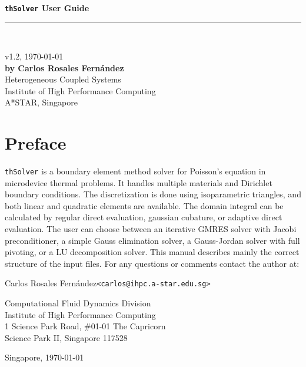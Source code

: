 \documentclass[12pt]{article}
\begin{document}
\begin{titlepage}
\verb+      +
\vspace{3cm}
\begin{flushright}
{\huge\bf\verb+thSolver+ User Guide}
\rule{150mm}{6pt}\\
\begin{large} v1.2, \today\\
\vspace{7cm}
{\bf by Carlos Rosales Fern\'andez}\\
Heterogeneous Coupled Systems\\
Institute of High Performance Computing\\
A*STAR, Singapore
\end{large}
\end{flushright}
\end{titlepage}
\pagebreak

\section*{Preface}\noindent \verb+thSolver+ is a boundary element method solver for Poisson's equation in microdevice thermal problems. It handles multiple materials and Dirichlet boundary conditions. The discretization is done using isoparametric triangles, and both linear and quadratic elements are available. The domain integral can be calculated by regular direct evaluation, gaussian cubature, or adaptive direct evaluation. The user can choose between an iterative GMRES solver with Jacobi preconditioner, a simple Gauss elimination solver, a Gauss-Jordan solver with full pivoting, or a LU decomposition solver. This manual describes mainly the correct structure of the input files. For any questions or comments contact the author at:\par\vspace{2em}

	Carlos Rosales Fern\'andez\hspace{1cm}\verb+<carlos@ihpc.a-star.edu.sg>+\par\vspace{1em}
	
	Computational Fluid Dynamics Division\\
	Institute of High Performance Computing\\
	1 Science Park Road, \#01-01 The Capricorn\\
	Science Park II, Singapore 117528

	\begin{flushright}Singapore, \today\end{flushright}
\pagebreak
\end{document}
